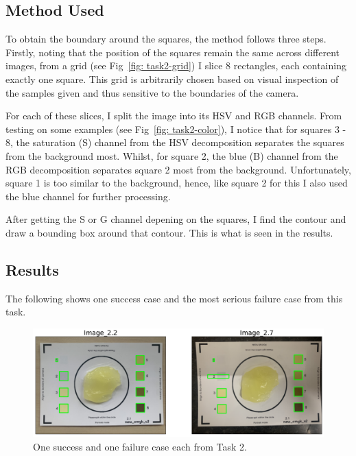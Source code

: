 \documentclass[12pt]{article}
\begin{document}
\subsection{Method Used}
To obtain the boundary around the squares, the method follows three steps. Firstly, noting that the position of the squares remain the same across different images, from a grid (see Fig~\ref{fig: task2-grid}) I slice 8 rectangles, each containing exactly one square. This grid is arbitrarily chosen based on visual inspection of the samples given and thus sensitive to the boundaries of the camera. 

For each of these slices, I split the image into its HSV and RGB channels. From testing on some examples (see Fig~\ref{fig: task2-color}), I notice that for squares 3 - 8, the saturation (S) channel from the HSV decomposition separates the squares from the background most. Whilst, for square 2, the blue (B) channel from the RGB decomposition separates square 2 most from the background. Unfortunately,  square 1 is too similar to the background, hence, like square 2 for this I also used the blue channel for further processing.

After getting the S or G channel depening on the squares, I find the contour and draw a bounding box around that contour. This is what is seen in the results.

\subsection{Results}
The following shows one success case and the most serious failure case from this task.

\begin{figure}[H]
\centerline{\includegraphics[width=.85\textwidth]{figs/task2-results.pdf}} 
	\caption{One success and one failure case each from Task 2.}
	\label{fig: task2-results}
\end{figure}
\end{document}
